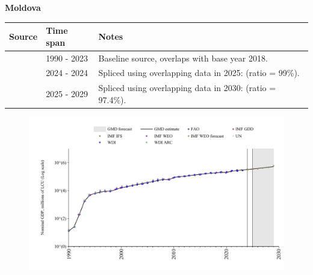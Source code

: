 \documentclass[12pt,a4paper,landscape]{article}
\begin{document}
\begin{adjustbox}{max totalsize={\paperwidth}{\paperheight},center}
\begin{minipage}[t][\textheight][t]{\textwidth}
\vspace*{0.5cm}
{}
\begin{center}
{\Large\bfseries Moldova}
\end{center}
\vspace{0.5cm}
\begin{table}[H]
\centering
\small
\begin{tabular}{|l|l|l|}
\hline
\textbf{Source} & \textbf{Time span} & \textbf{Notes} \\
\hline
\rowcolor{white}\cite{WDI}& 1990 - 2023 &Baseline source, overlaps with base year 2018.\\
\rowcolor{lightgray}\cite{IMF_IFS}& 2024 - 2024 &Spliced using overlapping data in 2025: (ratio = 99\%).\\
\rowcolor{white}\cite{IMF_WEO_forecast}& 2025 - 2029 &Spliced using overlapping data in 2030: (ratio = 97.4\%).\\
\hline
\end{tabular}
\end{table}
\begin{figure}[H]
\centering
\includegraphics[width=\textwidth,height=0.6\textheight,keepaspectratio]{graphs/MDA_nGDP.pdf}
\end{figure}
\end{minipage}
\end{adjustbox}
\end{document}

